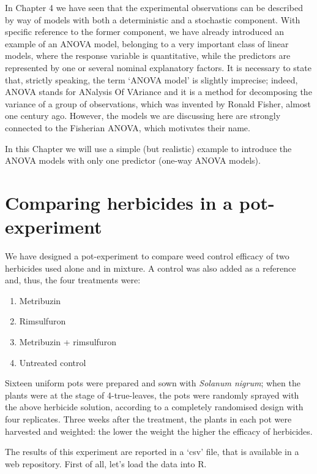 \documentclass[a4paper,12pt,oneside]{book}
\providecommand{\tightlist}{%
  \setlength{\itemsep}{0pt}\setlength{\parskip}{0pt}}
\begin{document}
In Chapter 4 we have seen that the experimental observations can be described by way of models with both a deterministic and a stochastic component. With specific reference to the former component, we have already introduced an example of an ANOVA model, belonging to a very important class of linear models, where the response variable is quantitative, while the predictors are represented by one or several nominal explanatory factors. It is necessary to state that, strictly speaking, the term `ANOVA model' is slightly imprecise; indeed, ANOVA stands for ANalysis Of VAriance and it is a method for decomposing the variance of a group of observations, which was invented by Ronald Fisher, almost one century ago. However, the models we are discussing here are strongly connected to the Fisherian ANOVA, which motivates their name.

In this Chapter we will use a simple (but realistic) example to introduce the ANOVA models with only one predictor (one-way ANOVA models).

\hypertarget{comparing-herbicides-in-a-pot-experiment}{%
\section{Comparing herbicides in a pot-experiment}\label{comparing-herbicides-in-a-pot-experiment}}

We have designed a pot-experiment to compare weed control efficacy of two herbicides used alone and in mixture. A control was also added as a reference and, thus, the four treatments were:

\begin{enumerate}
\def\labelenumi{\arabic{enumi}.}
\tightlist
\item
  Metribuzin
\item
  Rimsulfuron
\item
  Metribuzin + rimsulfuron
\item
  Untreated control
\end{enumerate}

Sixteen uniform pots were prepared and sown with \emph{Solanum nigrum}; when the plants were at the stage of 4-true-leaves, the pots were randomly sprayed with the above herbicide solution, according to a completely randomised design with four replicates. Three weeks after the treatment, the plants in each pot were harvested and weighted: the lower the weight the higher the efficacy of herbicides.

The results of this experiment are reported in a `csv' file, that is available in a web repository. First of all, let's load the data into R.
\end{document}
